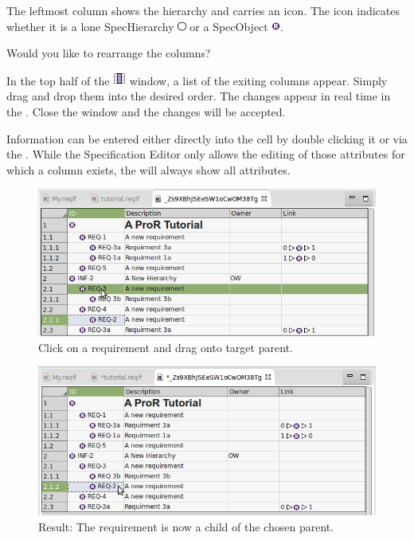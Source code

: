 The leftmost column shows the hierarchy and carries an icon.  The icon indicates whether it is a lone SpecHierarchy \includegraphics[height=0.8em]{../rmf-images/icons/full/obj16/spechierarchy.png} or a SpecObject \includegraphics[height=0.8em]{../rmf-images/icons/full/obj16/requirement.png}.

\begin{info}
Would you like to rearrange the columns?

In the top half of the  {\includegraphics[scale=0.6]{../rmf-images/icons/full/obj16/Column.png}} window, a list of the exiting columns appear. Simply drag and drop them into the desired order. The changes appear in real time in the . Close the window and the changes will be accepted.
\end{info}

Information can be entered either directly into the cell by double clicking it or via the .  While the Specification Editor only allows the editing of those attributes for which a column exists, the  will always show all attributes.

\begin{figure}
  \centering
  \includegraphics[width=0.8\linewidth]{../rmf-images/hierarchy_step_1.png}
  \caption{Click on a requirement and drag onto target parent.}
  \label{fig:hierarchy_step_1}
\end{figure}
\begin{figure}
  \centering
  \includegraphics[width=0.8\linewidth]{../rmf-images/hierarchy_step_2.png}
  \caption{Result: The requirement is now a child of the chosen parent.}
  \label{fig:hierarchy_step_2}
\end{figure}

